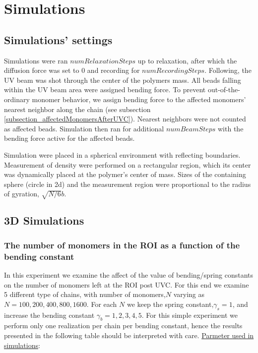 \documentclass[12pt]{report}
\begin{document}
	\section{Simulations}	
	
	\subsection{Simulations' settings}
	Simulations were ran $numRelaxationSteps$ up to relaxation, after which the diffusion force was set to $0$ and recording for $numRecordingSteps$. Following, the UV beam was shot through the center of the polymers mass. All beads falling within the UV beam area were assigned bending force. To prevent out-of-the-ordinary monomer behavior, we assign bending force to the affected monomers' nearest neighbor along the chain (see subsection \ref{subsection_affectedMonomersAfterUVC}). Nearest neighbors were not counted as affected beads. Simulation then ran for additional $numBeamSteps$ with the bending force active for the affected beads.
	
	Simulation were placed in a spherical environment with reflecting boundaries.
	Measurement of density were performed on a rectangular region, which its center was dynamically placed at the polymer's center of mass.
	Sizes of the containing sphere (circle in 2d) and the measurement region were proportional to the radius of gyration, $\sqrt{N/6}b$.
	
	\subsection{3D Simulations}
	 \subsubsection{The number of monomers in the ROI as a function of the bending constant}
	  In this experiment we examine the affect of the value of bending/spring constants on the number of monomers left at the ROI post UVC. 
	  For this end we examine 5 different type of chains, with number of monomers,$N$ varying as $N=100, 200, 400, 800,1600$. For each $N$ we keep the spring constant,$\gamma_s=1$, and increase the bending constant $\gamma_b= 1,2,3,4,5$. For this simple experiment we perform only one realization per chain per bending constant, hence the results presented in the following table should be interpreted  with care. 
	  \underline{Parmeter used in simulations}:
	  
\end{document}
